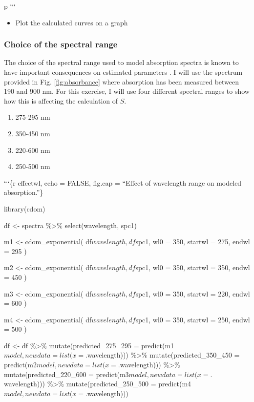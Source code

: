 \documentclass[]{book}
\providecommand{\tightlist}{%
  \setlength{\itemsep}{0pt}\setlength{\parskip}{0pt}}
\theoremstyle{definition}
\theoremstyle{definition}
\theoremstyle{remark}
\begin{document}
p ```

\begin{itemize}
\tightlist
\item
  Plot the calculated curves on a graph
\end{itemize}

\subsubsection{Choice of the spectral
range}\label{choice-of-the-spectral-range}

The choice of the spectral range used to model absorption spectra is
known to have important consequences on estimated parameters
\citep{Massicotte2016MC, Twardowski2004}. I will use the spectrum
provided in Fig. \ref{fig:absorbance} where absorption has been measured
between 190 and 900 nm. For this exercise, I will use four different
spectral ranges to show how this is affecting the calculation of \(S\).

\begin{enumerate}
\def\labelenumi{\arabic{enumi}.}
\tightlist
\item
  275-295 nm
\item
  350-450 nm
\item
  220-600 nm
\item
  250-500 nm
\end{enumerate}

```\{r effectwl, echo = FALSE, fig.cap = ``Effect of wavelength range on
modeled absorption.''\}

library(cdom)

df \textless{}- spectra \%\textgreater{}\% select(wavelength, spc1)

m1 \textless{}- cdom\_exponential( df\(wavelength, df\)spc1, wl0 = 350,
startwl = 275, endwl = 295 )

m2 \textless{}- cdom\_exponential( df\(wavelength, df\)spc1, wl0 = 350,
startwl = 350, endwl = 450 )

m3 \textless{}- cdom\_exponential( df\(wavelength, df\)spc1, wl0 = 350,
startwl = 220, endwl = 600 )

m4 \textless{}- cdom\_exponential( df\(wavelength, df\)spc1, wl0 = 350,
startwl = 250, endwl = 500 )

df \textless{}- df \%\textgreater{}\% mutate(predicted\_275\_295 =
predict(m1\(model, newdata = list(x = .\)wavelength)))
\%\textgreater{}\% mutate(predicted\_350\_450 =
predict(m2\(model, newdata = list(x = .\)wavelength)))
\%\textgreater{}\% mutate(predicted\_220\_600 =
predict(m3\(model, newdata = list(x = .\)wavelength)))
\%\textgreater{}\% mutate(predicted\_250\_500 =
predict(m4\(model, newdata = list(x = .\)wavelength)))
\end{document}
